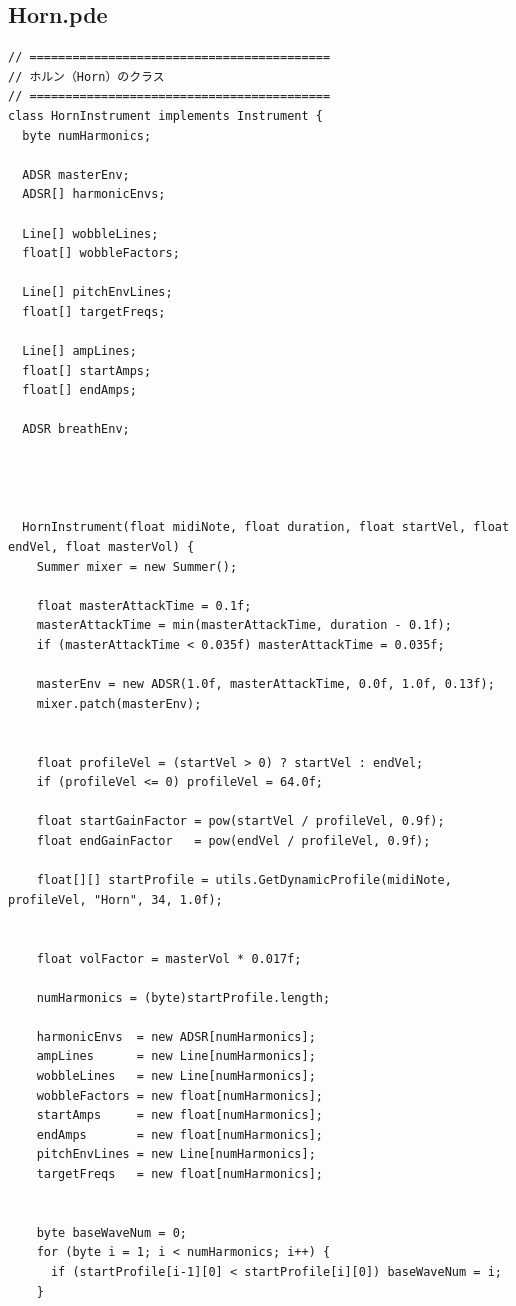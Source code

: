 \subsection{Horn.pde}
\begin{lstlisting}[caption={Horn.pde}, label={lst:proc_horn}]
// ==========================================
// ホルン（Horn）のクラス
// ==========================================
class HornInstrument implements Instrument {
  byte numHarmonics;
  
  ADSR masterEnv;
  ADSR[] harmonicEnvs;
  
  Line[] wobbleLines;
  float[] wobbleFactors;
  
  Line[] pitchEnvLines;
  float[] targetFreqs;
  
  Line[] ampLines;
  float[] startAmps;
  float[] endAmps;
  
  ADSR breathEnv;
  
  
  
  
  HornInstrument(float midiNote, float duration, float startVel, float endVel, float masterVol) {
    Summer mixer = new Summer();
    
    float masterAttackTime = 0.1f;
    masterAttackTime = min(masterAttackTime, duration - 0.1f);
    if (masterAttackTime < 0.035f) masterAttackTime = 0.035f;
    
    masterEnv = new ADSR(1.0f, masterAttackTime, 0.0f, 1.0f, 0.13f);
    mixer.patch(masterEnv);
    
    
    float profileVel = (startVel > 0) ? startVel : endVel;
    if (profileVel <= 0) profileVel = 64.0f;
    
    float startGainFactor = pow(startVel / profileVel, 0.9f);
    float endGainFactor   = pow(endVel / profileVel, 0.9f);
    
    float[][] startProfile = utils.GetDynamicProfile(midiNote, profileVel, "Horn", 34, 1.0f);
    
    
    float volFactor = masterVol * 0.017f;
    
    numHarmonics = (byte)startProfile.length;
    
    harmonicEnvs  = new ADSR[numHarmonics];
    ampLines      = new Line[numHarmonics];
    wobbleLines   = new Line[numHarmonics];
    wobbleFactors = new float[numHarmonics];
    startAmps     = new float[numHarmonics];
    endAmps       = new float[numHarmonics];
    pitchEnvLines = new Line[numHarmonics];
    targetFreqs   = new float[numHarmonics];
    
    
    byte baseWaveNum = 0;
    for (byte i = 1; i < numHarmonics; i++) {
      if (startProfile[i-1][0] < startProfile[i][0]) baseWaveNum = i;
    }
    

\end{lstlisting}
